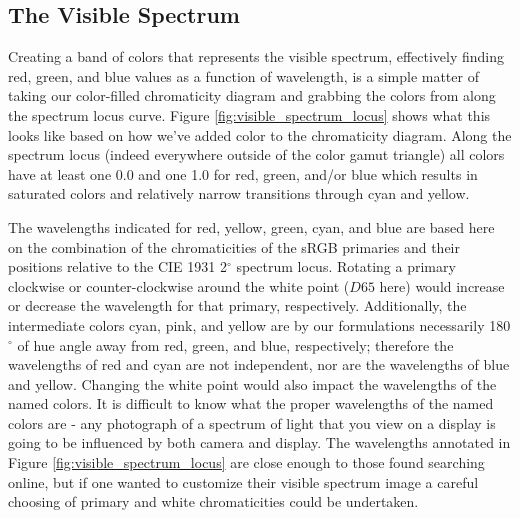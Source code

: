 \documentclass[twocolumn]{article}
\newif\ifinvert
\begin{document}
\subsection{The Visible Spectrum}
Creating a band of colors that represents the visible spectrum, effectively finding red, green, and blue values as a function of wavelength, is a simple matter of taking our color-filled chromaticity diagram and grabbing the colors from along the spectrum locus curve.  Figure \ref{fig:visible_spectrum_locus} shows what this looks like based on how we've added color to the chromaticity diagram.  Along the spectrum locus (indeed everywhere outside of the color gamut triangle) all colors have at least one 0.0 and one 1.0 for red, green, and/or blue which results in saturated colors and relatively narrow transitions through cyan and yellow.\\
\begin{figure*}[h]
    \ifinvert
        
    \else
        
    \fi
    \caption{Color-filled chromaticity diagram with annotated wavelengths.  The vertical strip to the right shows the colors along the spectrum locus.  Named colors are annotated along with the closest whole wavelength match; these are the points where the saturated colors have only 0 or 1 in them (e.g. $(1,0,1)$ for yellow).  IMAGE LINK, CODE LINK}\label{fig:visible_spectrum_locus}
\end{figure*}

The wavelengths indicated for red, yellow, green, cyan, and blue are based here on the combination of the chromaticities of the sRGB primaries and their positions relative to the CIE 1931 2$^\circ$ spectrum locus.  Rotating a primary clockwise or counter-clockwise around the white point ($D65$ here) would increase or decrease the wavelength for that primary, respectively.  Additionally, the intermediate colors cyan, pink, and yellow are by our formulations necessarily 180$^\circ$ of hue angle away from red, green, and blue, respectively; therefore the wavelengths of red and cyan are not independent, nor are the wavelengths of blue and yellow.  Changing the white point would also impact the wavelengths of the named colors.  It is difficult to know what the proper wavelengths of the named colors are - any photograph of a spectrum of light that you view on a display is going to be influenced by both camera and display.  The wavelengths annotated in Figure \ref{fig:visible_spectrum_locus} are close enough to those found searching online, but if one wanted to customize their visible spectrum image a careful choosing of primary and white chromaticities could be undertaken.\\
\end{document}
